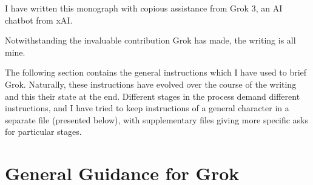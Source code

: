 \documentclass[10pt,titlepage]{book}
\begin{document}
I have written this monograph with copious assistance from Grok 3, an AI chatbot from xAI.

Notwithstanding the invaluable contribution Grok has made, the writing is all mine.

The following section contains the general instructions which I have used to brief Grok.
Naturally, these instructions have evolved over the course of the writing and this their state at the end.
Different stages in the process demand different instructions, and I have tried to keep instructions of a general character  in a separate file (presented below), with supplementary files giving more specific asks for particular stages.

\section{General Guidance for Grok}



\listoftables

{}



\renewcommand{\indexname}{Index of Defined Terms}
{\twocolumn[]
{\small\printindex}}


\end{document}
